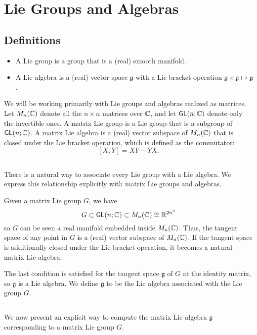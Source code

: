 \section{Lie Groups and Algebras}

\subsection{Definitions}
\begin{itemize}
    \item A Lie group is a group that is a (real) smooth manifold.
    \item A Lie algebra is a (real) vector space $\mathfrak g$ with a Lie bracket operation $\mathfrak g \times \mathfrak g \mapsto \mathfrak g$.
\end{itemize}
We will be working primarily with Lie groups and algebras realized as matrices. Let $M_n({\mathbb C})$ denote all the $n \times n$ matrices over ${\mathbb C}$, and let $\operatorname{\textsf{GL}}(n;{\mathbb C})$ denote only the invertible ones. A matrix Lie group is a Lie group that is a subgroup of $\operatorname{\textsf{GL}}(n; {\mathbb C})$. A matrix Lie algebra is a (real) vector subspace of $M_n({\mathbb C})$ that is closed under the Lie bracket operation, which is defined as the commutator:
\[
    [X, Y] = XY - YX.
\]

\subsection{}
There is a natural way to associate every Lie group with a Lie algebra. We express this relationship explicitly with matrix Lie groups and algebras.

Given a matrix Lie group $G$, we have
\[
    G \subset \operatorname{\textsf{GL}}(n; {\mathbb C}) \subset M_n({\mathbb C}) \cong {\mathbb R}^{2n^2}
\]
so $G$ can be seen a real manifold embedded inside $M_n({\mathbb C})$. Thus, the tangent space of any point in $G$ is a (real) vector subspace of $M_n({\mathbb C})$. If the tangent space is additionally closed under the Lie bracket operation, it becomes a natural matrix Lie algebra.

The last condition is satisfied for the tangent space $\mathfrak g$ of $G$ at the identity matrix, so $\mathfrak g$ is a Lie algebra. We define $\mathfrak g$ to be the Lie algebra associated with the Lie group $G$.

\subsection{}
We now present an explicit way to compute the matrix Lie algebra $\mathfrak g$ corresponding to a matrix Lie group $G$.

